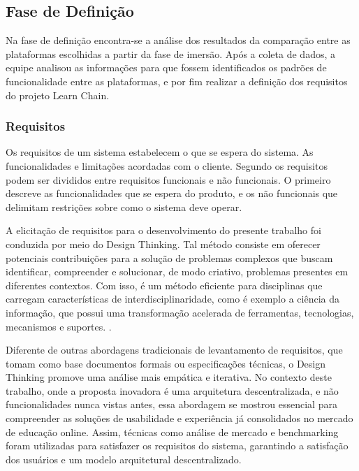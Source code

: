     \subsection{Fase de Definição}
    Na fase de definição encontra-se a análise dos resultados da comparação entre as plataformas escolhidas a partir da fase de imersão. Após a coleta de dados, a equipe analisou as informações para que fossem identificados os padrões de funcionalidade entre as plataformas, e por fim realizar a definição dos requisitos do projeto Learn Chain.

        \subsubsection{Requisitos}
        Os requisitos de um sistema estabelecem o que se espera do sistema. As funcionalidades e limitações acordadas com o cliente. Segundo \cite{sommerville2011} os requisitos podem ser divididos entre requisitos funcionais e não funcionais. O primeiro descreve as funcionalidades que se espera do produto, e os não funcionais que delimitam restrições sobre como o sistema deve operar.

        A elicitação de requisitos para o desenvolvimento do presente trabalho foi conduzida por meio do Design Thinking. Tal método consiste em oferecer potenciais contribuições para a solução de problemas complexos que buscam identificar, compreender e solucionar, de modo criativo, problemas presentes em diferentes contextos. Com isso, é um método eficiente para disciplinas que carregam características de interdisciplinaridade, como é exemplo a ciência da informação, que possui uma transformação acelerada de ferramentas, tecnologias, mecanismos e suportes. \cite{apocalypse2022}.

        Diferente de outras abordagens tradicionais de levantamento de requisitos, que tomam como base documentos formais ou especificações técnicas, o Design Thinking promove uma análise mais empática e iterativa. No contexto deste trabalho, onde a proposta inovadora é uma arquitetura descentralizada, e não funcionalidades nunca vistas antes, essa abordagem se mostrou essencial para compreender as soluções de usabilidade e experiência já consolidados no mercado de educação online. Assim, técnicas como análise de mercado e benchmarking foram utilizadas para satisfazer os requisitos do sistema, garantindo a satisfação dos usuários e um modelo arquitetural descentralizado.

